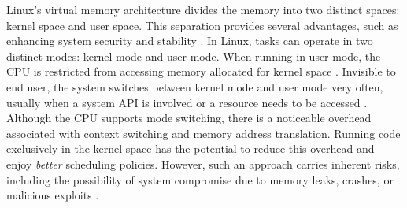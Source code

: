 Linux's virtual memory architecture divides the memory into two distinct spaces: kernel space and user space. This separation provides several advantages, such as enhancing system security and stability \cite{understanding_the_linux_kernel_bovet_cassetti}.
In Linux, tasks can operate in two distinct modes: kernel mode and user mode. When running in user mode, the CPU is restricted from accessing memory allocated for kernel space \cite{kerrisk_linux_2010}.
Invisible to end user, the system switches between kernel mode and user mode very often, usually when a system \ac{API} is involved or a resource needs to be accessed \cite{Robert_linux_kernel_dev}.
Although the CPU supports mode switching, there is a noticeable overhead associated with context switching and memory address translation. 
Running code exclusively in the kernel space has the potential to reduce this overhead and enjoy \textit{better} scheduling policies. 
However, such an approach carries inherent risks, including the possibility of system compromise due to memory leaks, crashes, or malicious exploits \cite{lwn_detect_kernel_mem_leak} \cite{emamdoost_detecting_2021}.

